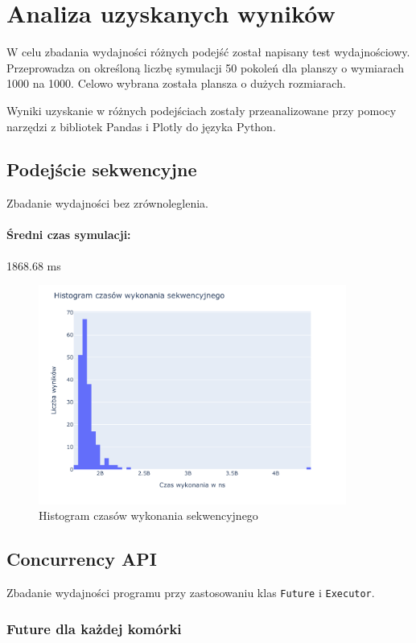 \documentclass{mwart}
\begin{document}
\section{Analiza uzyskanych wyników}
W celu zbadania wydajności różnych podejść został napisany test wydajnościowy. Przeprowadza on określoną liczbę symulacji 50 pokoleń dla planszy o wymiarach 1000 na 1000. Celowo wybrana została plansza o dużych rozmiarach.

Wyniki uzyskanie w różnych podejściach zostały przeanalizowane przy pomocy narzędzi z bibliotek Pandas i Plotly do języka Python.

\subsection{Podejście sekwencyjne}
Zbadanie wydajności bez zrównoleglenia.

\paragraph{Średni czas symulacji: } 1868.68 ms

\begin{figure}[H]
  \centering
  \includegraphics[width=0.9\textwidth]{Sequential_histogram}
  \caption{Histogram czasów wykonania sekwencyjnego}
\end{figure}

\subsection{Concurrency API}
Zbadanie wydajności programu przy zastosowaniu klas \texttt{Future} i \texttt{Executor}.

\subsubsection{Future dla każdej komórki}
\end{document}
